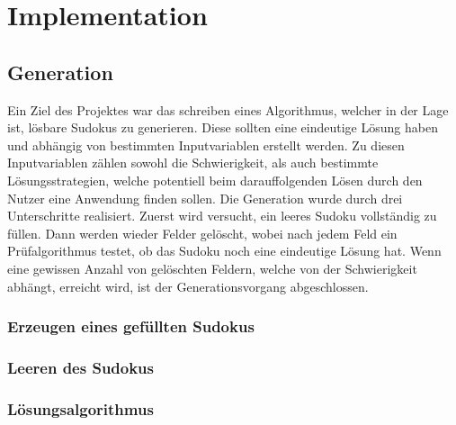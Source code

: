 \section{Implementation}

\subsection{Generation}

Ein Ziel des Projektes war das schreiben eines Algorithmus, welcher in der Lage ist, lösbare Sudokus zu generieren.
Diese sollten eine eindeutige Lösung haben und abhängig von bestimmten Inputvariablen erstellt werden.
Zu diesen Inputvariablen zählen sowohl die Schwierigkeit, als auch bestimmte Lösungsstrategien, welche potentiell beim 
darauffolgenden Lösen durch den Nutzer eine Anwendung finden sollen.
\newline
\newline
Die Generation wurde durch drei Unterschritte realisiert. Zuerst wird versucht, ein leeres Sudoku vollständig zu füllen.
Dann werden wieder Felder gelöscht, wobei nach jedem Feld ein Prüfalgorithmus testet, ob das Sudoku noch eine eindeutige Lösung hat.
Wenn eine gewissen Anzahl von gelöschten Feldern, welche von der Schwierigkeit abhängt, erreicht wird, ist der Generationsvorgang abgeschlossen.

\subsubsection{Erzeugen eines gefüllten Sudokus}

\subsubsection{Leeren des Sudokus}

\subsubsection{Lösungsalgorithmus}